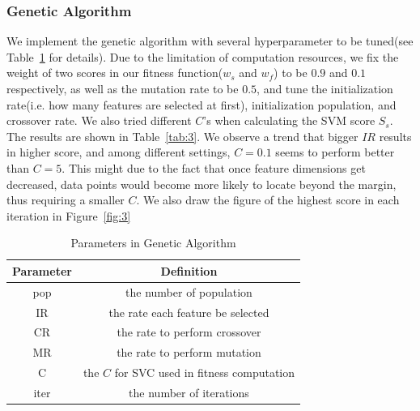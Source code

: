 \documentclass[journal]{IEEEtran}
\begin{document}
\subsubsection{Genetic Algorithm}
We implement the genetic algorithm with several hyperparameter to be tuned(see Table~\ref{tab:2} for details). Due to the limitation of computation resources, we fix the weight of two scores in our fitness function($w_s$ and $w_f$) to be $0.9$ and $0.1$ respectively, as well as the mutation rate to be $0.5$, and tune the initialization rate(i.e. how many features are selected at first), initialization population, and crossover rate. We also tried different $C$'s when calculating the SVM score $S_s$. The results are shown in Table~\ref{tab:3}. We observe a trend that bigger $IR$ results in higher score, and among different settings, $C=0.1$ seems to perform better than $C=5$. This might due to the fact that once feature dimensions get decreased, data points would become more likely to locate beyond the margin, thus requiring a smaller $C$. We also draw the figure of the highest score in each iteration in Figure~\ref{fig:3}
\begin{table}[htbp]
\centering
\caption{Parameters in Genetic Algorithm}
\label{tab:2}
\begin{tabular}{cc}
\toprule
Parameter&Definition \\  %
\midrule
pop&the number of population\\
IR&the rate each feature be selected\\
CR&the rate to perform crossover\\
MR&the rate to perform mutation\\
C&the $C$ for SVC used in fitness computation\\
iter&the number of iterations\\
\bottomrule
\end{tabular}
\end{table}
\end{document}
